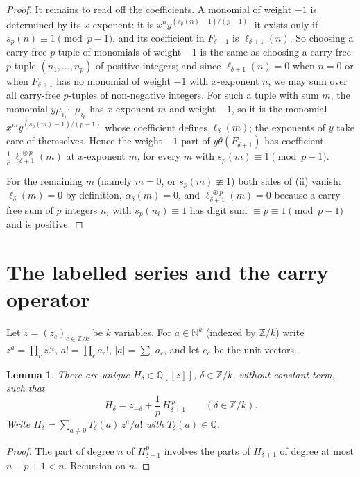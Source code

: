 \documentclass[11pt]{article}
\newtheorem{lemma}[theorem]{Lemma}
\theoremstyle{definition}
\theoremstyle{remark}
\newcommand{\Z}{\mathbb Z}
\newcommand{\Q}{\mathbb Q}
\newcommand{\N}{\mathbb N}
\newcommand{\cf}{\circledast}
\begin{document}
\begin{proof}
It remains to read off the coefficients. A monomial of weight $-1$ is determined by its
$x$-exponent: it is $x^ny^{(s_p(n)-1)/(p-1)}$, it exists only if $s_p(n)\equiv1\pmod{p-1}$,
and its coefficient in $F_{\delta+1}$ is $\ell_{\delta+1}(n)$. So choosing a carry-free
$p$-tuple of monomials of weight $-1$ is the same as choosing a carry-free $p$-tuple
$(n_1,\dots,n_p)$ of positive integers; and since $\ell_{\delta+1}(n)=0$ when $n=0$ or when
$F_{\delta+1}$ has no monomial of weight $-1$ with $x$-exponent $n$, we may sum over all
carry-free $p$-tuples of non-negative integers. For such a tuple with sum $m$, the monomial
$y\mu_{i_1}\cdots\mu_{i_p}$ has $x$-exponent $m$ and weight $-1$, so it is the monomial
$x^my^{(s_p(m)-1)/(p-1)}$ whose coefficient defines $\ell_\delta(m)$; the exponents of $y$
take care of themselves. Hence the weight $-1$ part of $y\theta(F_{\delta+1})$ has
coefficient $\frac1p\,\ell_{\delta+1}^{\;\cf p}(m)$ at $x$-exponent $m$, for every $m$ with
$s_p(m)\equiv1\pmod{p-1}$.

For the remaining $m$ (namely $m=0$, or $s_p(m)\not\equiv1$) both sides of (ii) vanish:
$\ell_\delta(m)=0$ by definition, $\alpha_\delta(m)=0$, and
$\ell_{\delta+1}^{\;\cf p}(m)=0$ because a carry-free sum of $p$ integers $n_i$ with
$s_p(n_i)\equiv1$ has digit sum $\equiv p\equiv1\pmod{p-1}$ and is positive.
\end{proof}

\section{The labelled series and the carry operator}

Let $z=(z_c)_{c\in\Z/k}$ be $k$ variables. For $a\in\N^k$ (indexed by $\Z/k$) write
$z^a=\prod_cz_c^{a_c}$, $a!=\prod_ca_c!$, $|a|=\sum_ca_c$, and let $e_c$ be the unit vectors.

\begin{lemma}\label{lem:H}
There are unique $H_\delta\in\Q[[z]]$, $\delta\in\Z/k$, without constant term, such that
\begin{equation}\label{eq:H}
 H_\delta=z_{-\delta}+\frac1p\,H_{\delta+1}^{\,p}\qquad(\delta\in\Z/k).
\end{equation}
Write $H_\delta=\sum_{a\ne0}T_\delta(a)\,z^a/a!$ with $T_\delta(a)\in\Q$.
\end{lemma}

\begin{proof}
The part of degree $n$ of $H_{\delta+1}^p$ involves the parts of $H_{\delta+1}$ of degree at
most $n-p+1<n$. Recursion on $n$.
\end{proof}
\end{document}
